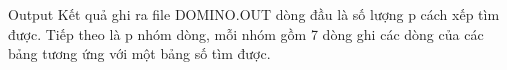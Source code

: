 Output
Kết quả ghi ra file DOMINO.OUT dòng đầu là số lượng p cách xếp tìm được. Tiếp theo là p nhóm dòng, mỗi nhóm gồm 7 dòng ghi các dòng của các bảng tương ứng với một bảng số tìm được.